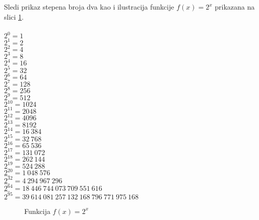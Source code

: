 \documentclass[a4paper]{article}
\begin{document}
Sledi prikaz stepena broja dva kao i ilustracija funkcije $f(x)=2^x$ prikazana na slici \ref{fig:exp}. \\\\
$ 2^0 = 1 $ \\
$ 2^1 = 2 $ \\
$ 2^2 = 4 $ \\
$ 2^3 = 8 $ \\ 
$ 2^4 = 16 $ \\
$ 2^5 = 32 $ \\
$ 2^6 = 64 $ \\
$ 2^7 = 128 $ \\
$ 2^8 = 256 $\\
$ 2^9 = 512 $ \\
$ 2^{10} = 1024 $ \\
$ 2^{11} = 2048 $ \\
$ 2^{12} = 4096 $ \\
$ 2^{13} = 8192 $ \\
$ 2^{14} = 16 \ 384 $ \\
$ 2^{15} = 32 \ 768 $ \\
$ 2^{16} = 65 \ 536 $ \\
$ 2^{17} = 131 \ 072$ \\
$ 2^{18} = 262 \ 144$ \\
$ 2^{19} = 524 \ 288$ \\
$ 2^{20} = 1 \ 048 \ 576$ \\
$ ... $ \\
$ 2^{32} = 4 \ 294 \ 967 \ 296$ \\
$ ... $ \\
$ 2^{64} = 18 \ 446 \ 744 \ 073 \ 709 \ 551 \ 616$ \\
$ ... $ \\
$ 2^{95} = 39 \ 614 \ 081 \ 257 \ 132 \ 168 \ 796 \ 771 \ 975 \ 168$ \\

\begin{figure}[h!]
  \begin{center}
  \caption{Funkcija $f(x) = 2^x$}
  \label{fig:exp}
  \end{center}
\end{figure}
\end{document}
